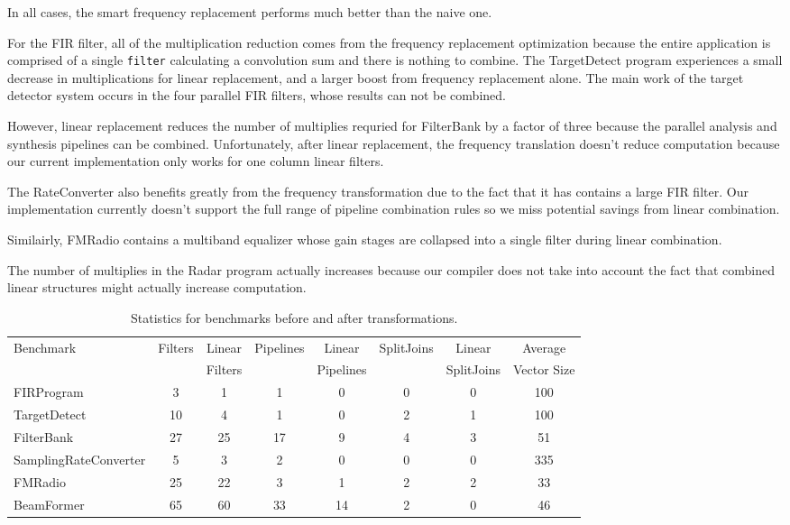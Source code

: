 In all cases, the smart frequency replacement performs much
better than the naive one.

For the FIR filter, all of the multiplication reduction comes from the frequency
replacement optimization because the entire application is comprised of a single
{\tt filter} calculating a convolution sum and there is nothing to combine.
The TargetDetect program experiences a small decrease in multiplications 
for linear replacement, and a larger boost from frequency replacement alone.
The main work of the target detector system occurs in the four parallel FIR filters, whose
results can not be combined.

However, linear replacement reduces the number of multiplies 
requried for FilterBank by a factor of three because the parallel analysis and 
synthesis pipelines can be combined. Unfortunately, after
linear replacement, the frequency translation doesn't reduce computation 
because our current implementation only works for one column linear filters.

The RateConverter also benefits greatly from the frequency transformation
due to the fact that it has contains a large FIR filter. Our implementation
currently doesn't support the full range of pipeline combination rules so
we miss potential savings from linear combination.

Similairly, FMRadio contains a multiband equalizer whose gain stages are collapsed
into a single filter during linear combination.

The number of multiplies in the Radar program actually increases because our 
compiler does not take into account the fact that combined linear structures 
might actually increase computation. %


\begin{table*}[t]
\begin{tabular}{|l|c|c||c|c||c|c||c|} 
\hline
Benchmark & Filters & Linear  & Pipelines & Linear    & SplitJoins & Linear     & Average  \\
          &         & Filters &           & Pipelines &            & SplitJoins & Vector Size\\
\hline
FIRProgram & 3 & 1 & 1 & 0 & 0 & 0 & 100 \\
\hline
TargetDetect & 10 & 4 & 1 & 0 & 2 & 1 & 100 \\
\hline
FilterBank & 27 & 25 & 17 & 9 & 4 & 3 & 51 \\
\hline
SamplingRateConverter & 5 & 3 & 2 & 0 & 0 & 0 & 335 \\
\hline
FMRadio & 25 & 22 & 3 & 1 & 2 & 2 & 33 \\
\hline
BeamFormer & 65 & 60 & 33 & 14 & 2 & 0 & 46 \\
\hline
\end{tabular}
\caption{Statistics for benchmarks before and after transformations.}
\label{fig:benchmark-stastics}
\end{table*}
